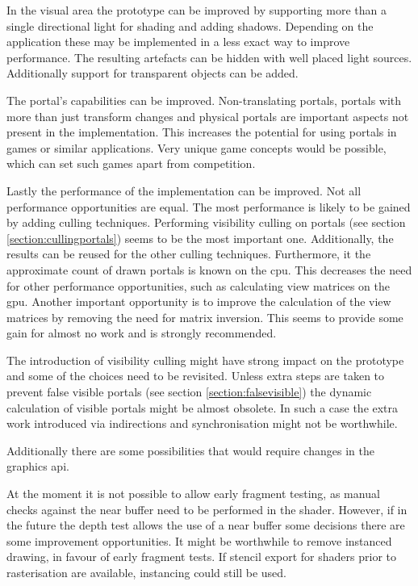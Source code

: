 In the visual area the prototype can be improved by supporting more than a single directional light for shading and adding shadows. Depending on the application these may be implemented in a less exact way to improve performance. The resulting artefacts can be hidden with well placed light sources. Additionally support for transparent objects can be added.

The portal's capabilities can be improved. Non-translating portals, portals with more than just transform changes and physical portals are important aspects not present in the implementation. This increases the potential for using portals in games or similar applications. Very unique game concepts would be possible, which can set such games apart from competition.

Lastly the performance of the implementation can be improved. Not all performance opportunities are equal. The most performance is likely to be gained by adding culling techniques. Performing visibility culling on portals (see section \ref{section:cullingportals}) seems to be the most important one. Additionally, the results can be reused for the other culling techniques. Furthermore, it the approximate count of drawn portals is known on the \gls{cpu}. This decreases the need for other performance opportunities, such as calculating view matrices on the \gls{gpu}. Another important opportunity is to improve the calculation of the view matrices by removing the need for matrix inversion. This seems to provide some gain for almost no work and is strongly recommended.

The introduction of visibility culling might have strong impact on the prototype and some of the choices need to be revisited. Unless extra steps are taken to prevent false visible portals (see section \ref{section:falsevisible}) the dynamic calculation of visible portals might be almost obsolete. In such a case the extra work introduced via indirections and synchronisation might not be worthwhile.

Additionally there are some possibilities that would require changes in the graphics \gls{api}.

At the moment it is not possible to allow early fragment testing, as manual checks against the near buffer need to be performed in the shader. However, if in the future the depth test allows the use of a near buffer some decisions there are some improvement opportunities. It might be worthwhile to remove instanced drawing, in favour of early fragment tests. If stencil export for shaders prior to rasterisation are available, instancing could still be used.

